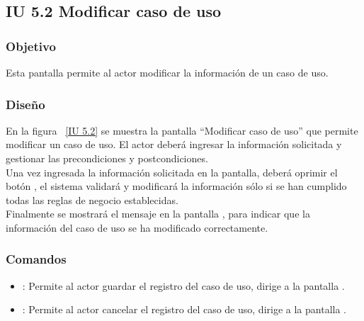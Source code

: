 \subsection{IU 5.2 Modificar caso de uso}

\subsubsection{Objetivo}
	
	Esta pantalla permite al actor modificar la información de un caso de uso.

\subsubsection{Diseño}

    En la figura ~\ref{IU 5.2} se muestra la pantalla ``Modificar caso de uso'' que permite modificar un caso de uso. El actor deberá ingresar la información solicitada y gestionar las precondiciones y postcondiciones.\\
    
    
    Una vez ingresada la información solicitada en la pantalla, deberá oprimir el botón 
    , el sistema validará y modificará la información sólo si se han cumplido todas las reglas de negocio establecidas.  \\
    
    Finalmente se mostrará el mensaje  en la pantalla , para indicar que la información del caso de uso se ha modificado correctamente.        


    


\subsubsection{Comandos}
\begin{itemize}
	\item {}: Permite al actor guardar el registro del caso de uso, dirige a la pantalla .
	\item {}: Permite al actor cancelar el registro del caso de uso, dirige a la pantalla .
\end{itemize}


